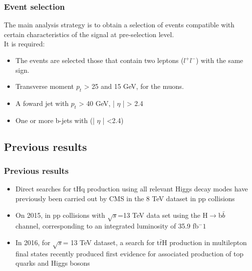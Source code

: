 \documentclass[11pt]{beamer}
\begin{document}
\begin{frame}
\frametitle{Event selection}
The main analysis strategy is to obtain a selection of events compatible with
certain characteristics of the signal at pre-selection level.\\

It is required:
\begin{itemize}
\item The events are selected those that contain two leptons ($l^+l^-$)  with the same sign.
\item Transverse moment $p_{t}$ > 25 and 15 GeV, for the muons.
\item A foward jet with $p_t$ > 40 GeV, | $\eta$ | > 2.4
\item One or more b-jets with (| $\eta$ | <2.4)\cite{1}
\end{itemize}
\end{frame}

\begin{frame}
\section{Previous results}
\frametitle{Previous results}
\begin{itemize}
\item Direct searches for tHq production using all relevant Higgs decay modes
have previously been carried out by CMS in the 8 TeV dataset in pp collisions\cite{5} 
\item On 2015, in pp collisions with $\sqrt{s}$=13 TeV data set using the H$\rightarrow$b$\bar{b}$ channel, corresponding to an
integrated luminosity of 35.9 fb$^-1$\cite{6}
\item In 2016, for $\sqrt{s}$= 13 TeV dataset, a search for t$\bar{t}$H production in multilepton
final states recently produced first evidence for associated production of top quarks and Higgs
bosons\cite{2}
\end{itemize}
\end{frame}
\end{document}
